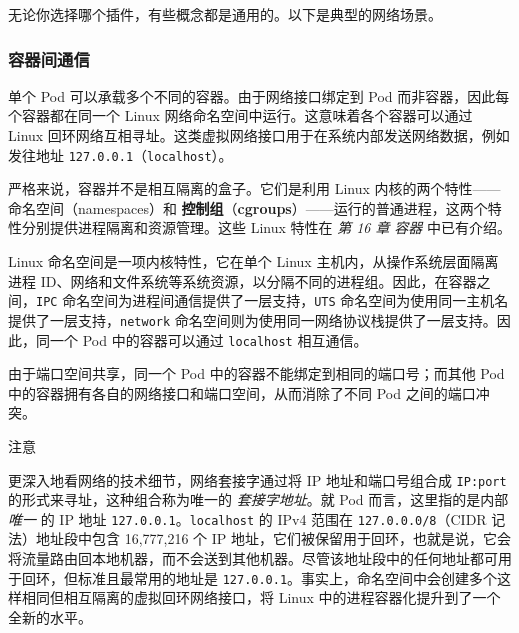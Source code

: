 
无论你选择哪个插件，有些概念都是通用的。以下是典型的网络场景。

\subsubsection{容器间通信}

\label{idx:1992}
\label{idx:1993}
单个 Pod 可以承载多个不同的容器。由于网络接口绑定到 Pod 而非容器，因此每个容器都在同一个 Linux 网络命名空间中运行。这意味着各个容器可以通过 Linux 回环网络互相寻址。这类虚拟网络接口用于在系统内部发送网络数据，例如发往地址 \texttt{127.0.0.1}（\texttt{localhost}）。


\label{idx:1994}
严格来说，容器并不是相互隔离的盒子。它们是利用 Linux 内核的两个特性——命名空间（namespaces）和 \textbf{控制组}（\textbf{cgroups}）——运行的普通进程，这两个特性分别提供进程隔离和资源管理。这些 Linux 特性在 \emph{第 16 章} \emph{容器} 中已有介绍。

Linux 命名空间是一项内核特性，它在单个 Linux 主机内，从操作系统层面隔离进程 ID、网络和文件系统等系统资源，以分隔不同的进程组。因此，在容器之间，\texttt{IPC} 命名空间为进程间通信提供了一层支持，\texttt{UTS} 命名空间为使用同一主机名提供了一层支持，\texttt{network} 命名空间则为使用同一网络协议栈提供了一层支持。因此，同一个 Pod 中的容器可以通过 \texttt{localhost} 相互通信。

\label{idx:1995}
\label{idx:1996}
由于端口空间共享，同一个 Pod 中的容器不能绑定到相同的端口号；而其他 Pod 中的容器拥有各自的网络接口和端口空间，从而消除了不同 Pod 之间的端口冲突。

\begin{myNotic}{注意}

更深入地看网络的技术细节，网络套接字通过将 IP 地址和端口号组合成 \texttt{IP:port} 的形式来寻址，这种组合称为唯一的 \emph{套接字地址}。就 Pod 而言，这里指的是内部 \emph{唯一} 的 IP 地址 \texttt{127.0.0.1}。\texttt{localhost} 的 IPv4 范围在 \texttt{127.\allowbreak{}0.\allowbreak{}0.\allowbreak{}0/\allowbreak{}8}（CIDR 记法）地址段中包含 16,777,216 个 IP 地址，它们被保留用于回环，也就是说，它会将流量路由回本地机器，而不会送到其他机器。尽管该地址段中的任何地址都可用于回环，但标准且最常用的地址是 \texttt{127.0.0.1}。事实上，命名空间中会创建多个这样相同但相互隔离的虚拟回环网络接口，将 Linux 中的进程容器化提升到了一个全新的水平。
\end{myNotic}

